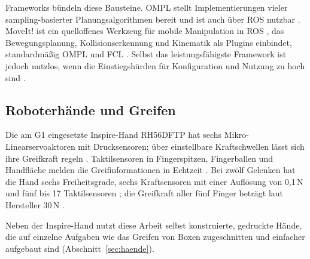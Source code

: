 Frameworks bündeln diese Bausteine.
OMPL stellt Implementierungen vieler sampling-basierter Planungsalgorithmen bereit \cite{Sucan2012} und ist auch über ROS nutzbar \cite{Sucan2012}.
MoveIt! ist ein quelloffenes Werkzeug für mobile Manipulation in ROS \cite{Coleman2014}, das Bewegungsplanung, Kollisionserkennung und Kinematik als Plugins einbindet, standardmäßig OMPL und FCL \cite{Coleman2014}.
Selbst das leistungsfähigste Framework ist jedoch nutzlos, wenn die Einstiegshürden für Konfiguration und Nutzung zu hoch sind \cite{Coleman2014}.

\subsection{Roboterhände und Greifen}
\label{sec:haende_sdt}

Die am G1 eingesetzte Inspire-Hand RH56DFTP hat sechs Mikro-Linearservoaktoren mit Drucksensoren; über einstellbare Kraftschwellen lässt sich ihre Greifkraft regeln \cite{Inspire2024}.
Taktilsensoren in Fingerspitzen, Fingerballen und Handfläche melden die Greifinformationen in Echtzeit \cite{Inspire2024}.
Bei zwölf Gelenken hat die Hand sechs Freiheitsgrade, sechs Kraftsensoren mit einer Auflösung von 0,1\,N und fünf bis 17 Taktilsensoren \cite{Inspire2024}; die Greifkraft aller fünf Finger beträgt laut Hersteller 30\,N \cite{Inspire2024}.

Neben der Inspire-Hand nutzt diese Arbeit selbst konstruierte, gedruckte Hände, die auf einzelne Aufgaben wie das Greifen von Boxen zugeschnitten und einfacher aufgebaut sind (Abschnitt~\ref{sec:haende}).

